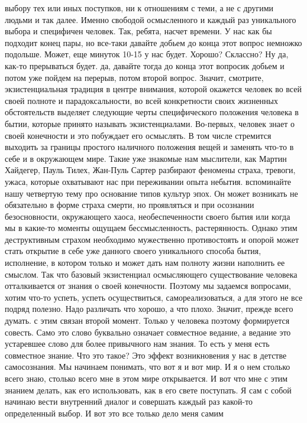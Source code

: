 выбору тех или иных поступков, ни к отношениям с теми, а не с другими людьми и
так далее. Именно свободой осмысленного и каждый раз уникального выбора и
специфичен человек. Так, ребята, насчет времени. У нас как бы подходит конец
пары, но все-таки давайте добьем до конца этот вопрос немножко подольше. Может,
еще минуток 10-15 у нас будет. Хорошо? Склассно? Ну да, как-то прерываться
будет. да, давайте тогда до конца этот вопросик добьем и потом уже пойдем на
перерыв, потом второй вопрос. Значит, смотрите, экзистенциальная традиция в
центре внимания, которой окажется человек во всей своей полноте и
парадоксальности, во всей конкретности своих жизненных обстоятельств выделяет
следующие черты специфического положения человека в бытии, которые принято
называть экзистенциалами. Во-первых, человек знает о своей конечности и это
побуждает его осмыслять. В том числе стремится выходить за границы простого
наличного положения вещей и заменять что-то в себе и в окружающем мире. Такие
уже знакомые нам мыслители, как Мартин Хайдегер, Пауль Тилех, Жан-Пуль Сартер
разбирают феномены страха, тревоги, ужаса, которые охватывают нас при
переживании опыта небытия. вспоминайте нашу четвертую тему про основание типов
культур эпох. Он может возникать не обязательно в форме страха смерти, но
проявляться и при осознании безосновности, окружающего хаоса, необеспеченности
своего бытия или когда мы в какие-то моменты ощущаем бессмысленность,
растерянность. Однако этим деструктивным страхом необходимо мужественно
противостоять и опорой может стать открытие в себе уже данного своего
уникального способа бытия, исполнение, в котором только и может дать нам полноту
жизни наполнить ее смыслом. Так что базовый экзистенциал осмысляющего
существование человека отталкивается от знания о своей конечности. Поэтому мы
задаемся вопросами, хотим что-то успеть, успеть осуществиться,
самореализоваться, а для этого не все подряд полезно. Надо различать что хорошо,
а что плохо. Значит, прежде всего думать. с этим связан второй момент. Только у
человека поэтому формируется совесть. Само это слово буквально означает
совместное ведание, а ведание это устаревшее слово для более привычного нам
знания. То есть у меня есть совместное знание. Что это такое? Это эффект
возникновения у нас в детстве самосознания. Мы начинаем понимать, что вот я и
вот мир. И я о нем столько всего знаю, столько всего мне в этом мире
открывается. И вот что мне с этим знанием делать, как его использовать, как в
его свете поступать. Я сам с собой начинаю вести внутренний диалог и совершать
каждый раз какой-то определенный выбор. И вот это все только дело меня самим
